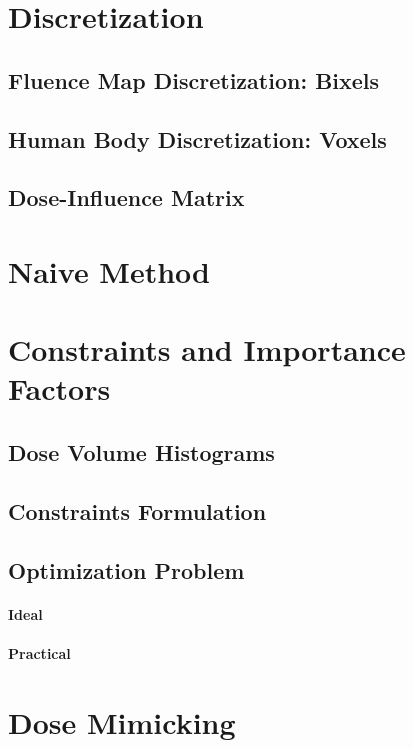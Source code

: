 
\section{Discretization}
\subsection[Bixels]{Fluence Map Discretization: Bixels}

\subsection[Voxels]{Human Body Discretization: Voxels}

\subsection[DI-Matrix]{Dose-Influence Matrix}

\section{Naive Method}
\section{Constraints and Importance Factors}
\subsection[DVHs]{Dose Volume Histograms}
\subsection{Constraints Formulation}
\subsection{Optimization Problem}
\paragraph{Ideal}
\paragraph{Practical}

\section{Dose Mimicking}

